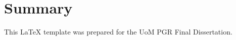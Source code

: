 \newpage 
\thispagestyle{plain} 
\section*{Summary}
     This LaTeX template was prepared for the UoM PGR Final Dissertation.